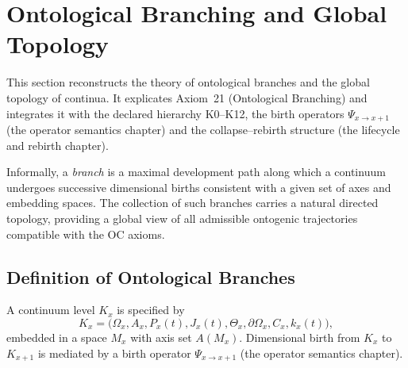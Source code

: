
\section{Ontological Branching and Global Topology}
\label{sec:branching-topology}

This section reconstructs the theory of ontological branches and the global
topology of continua. It explicates Axiom~21 (Ontological Branching) and
integrates it with the declared hierarchy K0--K12, the birth
operators \(\Psi_{x\to x+1}\) (the operator semantics chapter) and the
collapse–rebirth structure (the lifecycle and rebirth chapter).

Informally, a \emph{branch} is a maximal development path along which a
continuum undergoes successive dimensional births consistent with a given set
of axes and embedding spaces. The collection of such branches carries a natural
directed topology, providing a global view of all admissible ontogenic
trajectories compatible with the OC axioms.

\subsection{Definition of Ontological Branches}

A continuum level \(K_x\) is specified by
\[
  K_x =
  \big(
    \Omega_x, A_x, P_x(t), J_x(t),
    \Theta_x, \partial\Omega_x, C_x, k_x(t)
  \big),
\]
embedded in a space \(M_x\) with axis set \(A(M_x)\). Dimensional birth from
\(K_x\) to \(K_{x+1}\) is mediated by a birth operator
\(\Psi_{x\to x+1}\) (the operator semantics chapter).

